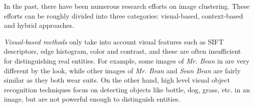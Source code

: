 
In the past, there have been numerous research efforts on image clustering.
These efforts can be roughly divided into three categories: visual-based,
context-based and hybrid approaches.

{\em Visual-based methods}
only take into account visual features such as SIFT descriptors,
edge histogram, color and contrast\cite{Fu2011,ZhongLL11},
and these are often insufficient for distinguishing real entities.
For example, some images of {\em Mr. Bean}
in  are very different by the look,
while other images of {\em Mr. Bean} and {\em Sean Bean} are fairly
similar as they both wear suits.
On the other hand, high level visual object recognition
techniques\cite{Li09scene,Krizhevsky12} focus on detecting objects like
bottle, dog, grass, etc. in an image, but are not powerful enough
to distinguish entities.



